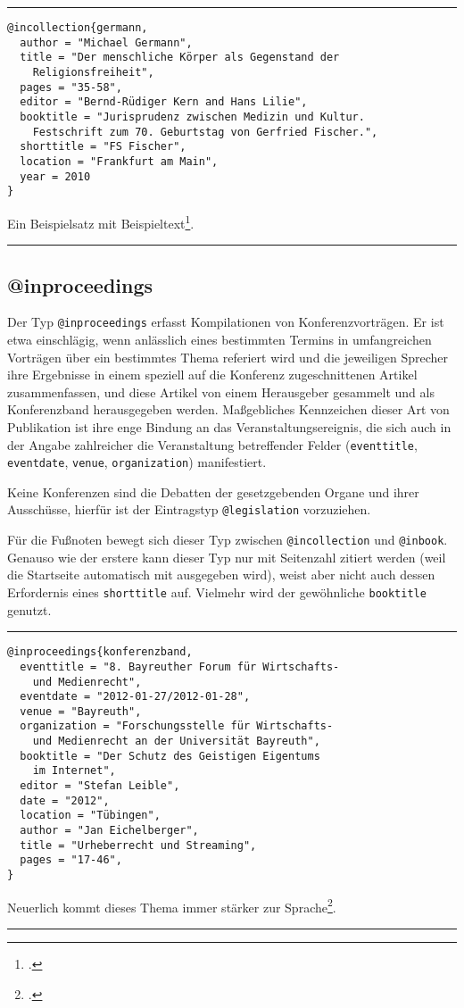 \documentclass[11pt,a4paper,DIV=calc]{scrartcl}
\newenvironment{rubexample}{\par\vspace{\baselineskip}\hrule\par\begin{refsection}}{\end{refsection}\par\hrule\par\vspace{\baselineskip}}
\begin{document}
\begin{rubexample}
\begin{verbatim}
@incollection{germann,
  author = "Michael Germann",
  title = "Der menschliche Körper als Gegenstand der
    Religionsfreiheit",
  pages = "35-58",
  editor = "Bernd-Rüdiger Kern and Hans Lilie",
  booktitle = "Jurisprudenz zwischen Medizin und Kultur.
    Festschrift zum 70. Geburtstag von Gerfried Fischer.",
  shorttitle = "FS Fischer",
  location = "Frankfurt am Main",
  year = 2010
}
\end{verbatim}

Ein Beispielsatz mit Beispieltext\footcite[41]{germann}.

\printbibliography
\end{rubexample}

\subsection{@inproceedings}

Der Typ \verb+@inproceedings+ erfasst Kompilationen von
Konferenzvorträgen. Er ist etwa einschlägig, wenn anlässlich eines
bestimmten Termins in umfangreichen Vorträgen über ein bestimmtes
Thema referiert wird und die jeweiligen Sprecher ihre Ergebnisse in
einem speziell auf die Konferenz zugeschnittenen Artikel
zusammenfassen, und diese Artikel von einem Herausgeber gesammelt und
als Konferenzband herausgegeben werden. Maßgebliches Kennzeichen
dieser Art von Publikation ist ihre enge Bindung an das
Veranstaltungsereignis, die sich auch in der Angabe zahlreicher die
Veranstaltung betreffender Felder (\verb+eventtitle+,
\verb+eventdate+, \verb+venue+, \verb+organization+) manifestiert.

Keine Konferenzen sind die Debatten der gesetzgebenden Organe und
ihrer Ausschüsse, hierfür ist der Eintragstyp \verb+@legislation+
vorzuziehen.

Für die Fußnoten bewegt sich dieser Typ zwischen \verb+@incollection+
und \verb+@inbook+. Genauso wie der erstere kann dieser Typ nur mit
Seitenzahl zitiert werden (weil die Startseite automatisch mit
ausgegeben wird), weist aber nicht auch dessen Erfordernis eines
\verb+shorttitle+ auf. Vielmehr wird der gewöhnliche \verb+booktitle+
genutzt.

\begin{rubexample}
\begin{verbatim}
@inproceedings{konferenzband,
  eventtitle = "8. Bayreuther Forum für Wirtschafts-
    und Medienrecht",
  eventdate = "2012-01-27/2012-01-28",
  venue = "Bayreuth",
  organization = "Forschungsstelle für Wirtschafts-
    und Medienrecht an der Universität Bayreuth",
  booktitle = "Der Schutz des Geistigen Eigentums
    im Internet",
  editor = "Stefan Leible",
  date = "2012",
  location = "Tübingen",
  author = "Jan Eichelberger",
  title = "Urheberrecht und Streaming",
  pages = "17-46",
}
\end{verbatim}

Neuerlich kommt dieses Thema immer stärker zur
Sprache\footcite[25]{konferenzband}.

\printbibliography
\end{rubexample}
\end{document}
